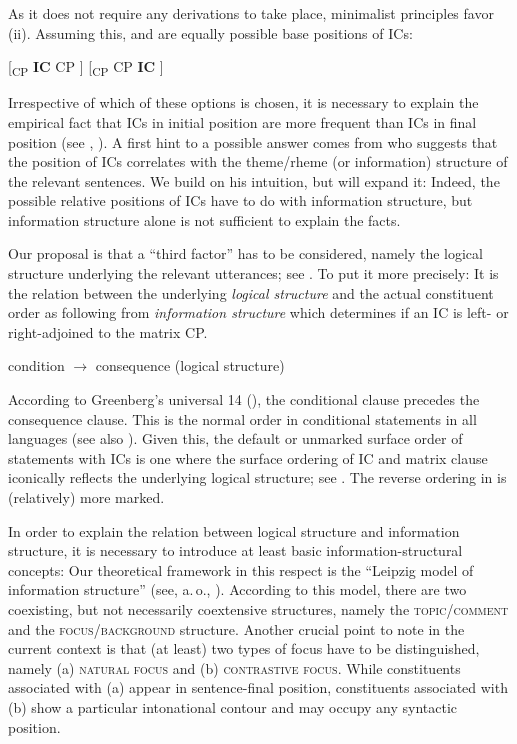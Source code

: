 \documentclass[output=paper,colorlinks,citecolor=brown,
modfonts,newtxmath
]{langscibook}
\begin{document}
\noindent As it does not require any derivations to take place, minimalist principles favor (ii). Assuming this,  and  are equally possible base positions of ICs:

\ea
\ea\label{tree:left}
{[\textsubscript{CP} \textbf{IC} CP ]}
\ex\label{tree:right}
{[\textsubscript{CP} CP \textbf{IC} ]}
\z
\z

\noindent Irrespective of which of these options is chosen, it is necessary to explain the empirical fact that ICs in initial position are more frequent than ICs in final position (see \citealt[74--75]{Svoboda1960a}, \citealt{Milotova2011,Milotova2012}). A first hint to a possible answer comes from \citet[75]{Svoboda1960a} who suggests that the position of ICs correlates with the theme/rheme (or information) structure of the relevant sentences. We build on his intuition, but will expand it: Indeed, the possible relative positions of ICs have to do with information structure, but information structure alone is not sufficient to explain the facts. 

Our proposal is that a ``third factor'' has to be considered, namely the logical structure underlying the relevant utterances; see . To put it more precisely: It is the relation between the underlying \textit{logical structure} and the actual constituent order as following from \textit{information structure} which determines if an IC is left- or right-adjoined to the matrix CP.

\ea\label{ex:logical}
condition $\rightarrow$ consequence \hfill (logical structure)
\z

\noindent According to Greenberg's universal 14 (\citealt[66]{Greenberg1963}), the conditional clause precedes the consequence clause. This is the normal order in conditional statements in all languages (see also \citealt[445--446]{Diessel2001}). Given this, the default or unmarked surface order of statements with ICs is one where the surface ordering of IC and matrix clause iconically reflects the underlying logical structure; see . The reverse ordering in  is (relatively) more marked.

In order to explain the relation between logical structure and information structure, it is necessary to introduce at least basic information-structural concepts: Our theoretical framework in this respect is the ``Leipzig model of information structure'' (see, a.\,o., \citealt{JunghannsZybatow2009}). According to this model, there are two coexisting, but not necessarily coextensive structures, namely the \textsc{topic/comment} and the \textsc{focus/background} structure. Another crucial point to note in the current context is that (at least) two types of focus have to be distinguished, namely (a) \textsc{natural focus} and (b) \textsc{contrastive focus}. While constituents associated with (a) appear in sentence-final position, constituents associated with (b) show a particular intonational contour and may occupy any syntactic position.
\end{document}
